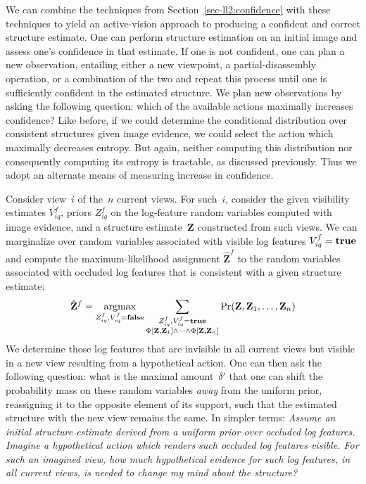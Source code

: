 We can combine the techniques from Section~\ref{sec-ll2:confidence} with these
techniques to yield an active-vision \cite{Bajcsy1988} approach to producing a
confident and correct structure estimate.
%
One can perform structure estimation on an initial image and assess one's
confidence in that estimate.
%
If one is not confident, one can plan a new observation, entailing either a new
viewpoint, a partial-disassembly operation, or a combination of the two and
repeat this process until one is sufficiently confident in the estimated
structure.
%
We plan new observations by asking the following question: which of the
available actions maximally increases confidence?
%
Like before, if we could determine the conditional distribution over consistent
structures given image evidence, we could select the action which maximally
decreases entropy.
%
But again, neither computing this distribution nor consequently computing its
entropy is tractable, as discussed previously.
%
Thus we adopt an alternate means of measuring increase in confidence.

Consider view~$i$ of the~$n$ current views.
%
For such~$i$, consider the given visibility estimates $V^f_{iq}$, priors
$Z^f_{iq}$ on the log-feature random variables computed with image evidence,
and a structure estimate~$\mathbf{Z}$ constructed from such views.
%
We can marginalize over random variables associated with visible log features
$V^f_{iq} = \mathbf{true}$ and compute the maximum-likelihood assignment
$\hat{\mathbf{Z}}^f$ to the random variables associated with occluded log
features that is consistent with a given structure estimate:
%
\begin{equation*}
  \hat{\mathbf{Z}}^f=\operatorname*{argmax}_{\substack{Z^f_{iq},V^f_{iq}=\mathbf{false}}}
  \sum_{\substack{Z^f_{iq},V^f_{iq}=\mathbf{true}\\
      \Phi[\mathbf{Z},\mathbf{Z}_1]\wedge\cdots\wedge\Phi[\mathbf{Z},\mathbf{Z}_n]}}
  \Pr(\mathbf{Z},\mathbf{Z}_1,\ldots,\mathbf{Z}_n)
\end{equation*}
%
We determine those log features that are invisible in all current views but
visible in a new view resulting from a hypothetical action.
%
One can then ask the following question: what is the maximal amount~$\delta'$
that one can shift the probability mass on these random variables \emph{away}
from the uniform prior, reassigning it to the opposite element of its support,
such that the estimated structure with the new view remains the same.
%
In simpler terms: \emph{Assume an initial structure estimate derived from a
  uniform prior over occluded log features.
  Imagine a hypothetical action which renders such occluded log features
  visible.
  For such an imagined view, how much hypothetical evidence for such log
  features, in all current views, is needed to change my mind about the
  structure?}

